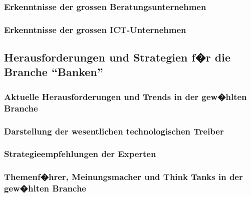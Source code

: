 \documentclass[a4paper, 11pt]{article} %
\begin{document}
\subsubsection{Erkenntnisse der grossen Beratungsunternehmen}


\subsubsection{Erkenntnisse der grossen ICT-Unternehmen}



\subsection{Herausforderungen und Strategien f�r die Branche ``Banken''}

\subsubsection{Aktuelle Herausforderungen und Trends in der gew�hlten Branche}


\subsubsection{Darstellung der wesentlichen technologischen Treiber}


\subsubsection{Strategieempfehlungen der Experten}


\subsubsection{Themenf�hrer, Meinungsmacher und Think Tanks in der gew�hlten Branche}


\end{document}

